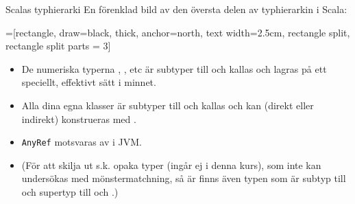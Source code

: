 \begin{Slide}{Scalas typhierarki}\SlideFontSmall
En förenklad bild av den översta delen av typhierarkin i Scala:
\vspace{0.5em}
\begin{center}
\newcommand{\TextBox}[1]{\raisebox{0pt}[1em][0.5em]{#1}}
=[rectangle, draw=black,  thick, anchor=north, text width=2.5cm, rectangle split, rectangle split parts = 3]
\end{center}
\begin{itemize}\SlideFontSmall
\item De numeriska typerna , , etc är subtyper till  och kallas  och lagras på ett speciellt, effektivt sätt i minnet.
\item Alla dina egna klasser är subtyper till  och kallas  och kan (direkt eller indirekt) konstrueras med .
\item \texttt{AnyRef} motsvaras av  i JVM.
\item (För att skilja ut s.k. opaka typer (ingår ej i denna kurs), som inte kan undersökas med mönstermatchning, så är finns även typen  som är subtyp till  och supertyp till  och .)
\end{itemize}
\end{Slide}



